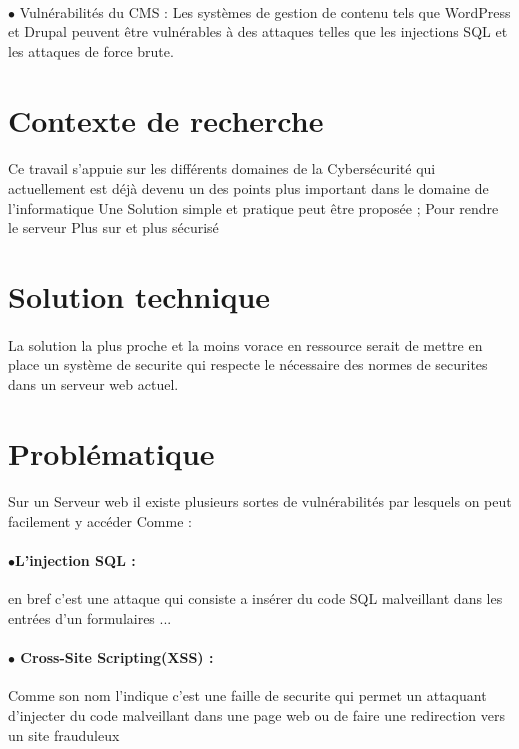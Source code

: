 \documentclass{report}
\begin{document}
  \paragraph{ }
  $\bullet$ Vulnérabilités du CMS : Les systèmes de gestion de contenu tels que WordPress et Drupal peuvent être vulnérables à des attaques telles que les injections SQL et les attaques de force brute.
  
  
   \section{Contexte de recherche }
   \paragraph{ } Ce travail s'appuie sur les différents domaines   de la  Cybersécurité qui actuellement est déjà devenu un  des points  plus   important dans le domaine de l'informatique 
   Une Solution simple et pratique peut être proposée  \space;
   Pour rendre le serveur Plus sur et plus sécurisé
   \section{Solution technique} 
   \paragraph{ }
   La solution la plus proche et la moins vorace en ressource serait de mettre en place un système de securite qui respecte le nécessaire des normes de securites dans un serveur web actuel.
   \section{Problématique }
   \paragraph{ }
   Sur un Serveur web il existe plusieurs sortes de vulnérabilités par lesquels on peut facilement y accéder Comme : 
     \paragraph {$\bullet$L'injection SQL : }
      en bref c'est une attaque qui consiste a insérer du code SQL malveillant  dans les entrées   d'un formulaires ...
   
   \paragraph{$\bullet$ Cross-Site Scripting(XSS) :} Comme son nom l'indique c'est une faille de securite qui permet un attaquant d'injecter du code malveillant dans une page web ou de faire une redirection vers un site frauduleux 
\end{document}
